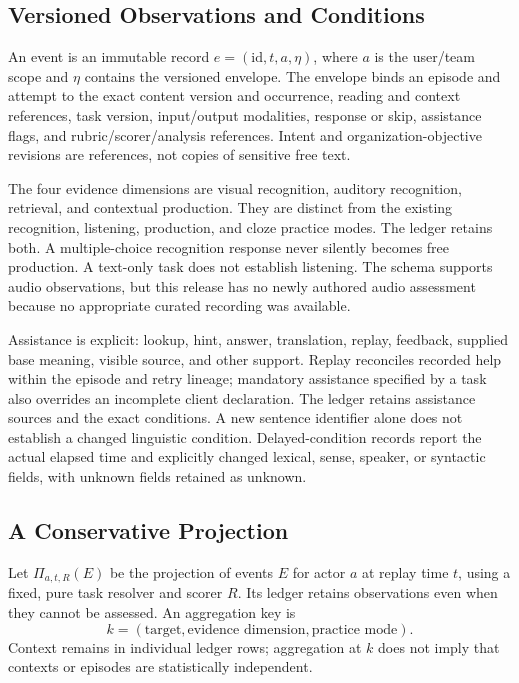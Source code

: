 \documentclass{article}
\begin{document}
\subsection{Versioned Observations and Conditions}

An event is an immutable record $e=(\mathrm{id},t,a,\eta)$, where $a$ is the user/team scope and $\eta$ contains the versioned envelope. The envelope binds an episode and attempt to the exact content version and occurrence, reading and context references, task version, input/output modalities, response or skip, assistance flags, and rubric/scorer/analysis references. Intent and organization-objective revisions are references, not copies of sensitive free text.

The four evidence dimensions are visual recognition, auditory recognition, retrieval, and contextual production. They are distinct from the existing recognition, listening, production, and cloze practice modes. The ledger retains both. A multiple-choice recognition response never silently becomes free production. A text-only task does not establish listening. The schema supports audio observations, but this release has no newly authored audio assessment because no appropriate curated recording was available.

Assistance is explicit: lookup, hint, answer, translation, replay, feedback, supplied base meaning, visible source, and other support. Replay reconciles recorded help within the episode and retry lineage; mandatory assistance specified by a task also overrides an incomplete client declaration. The ledger retains assistance sources and the exact conditions. A new sentence identifier alone does not establish a changed linguistic condition. Delayed-condition records report the actual elapsed time and explicitly changed lexical, sense, speaker, or syntactic fields, with unknown fields retained as unknown.

\subsection{A Conservative Projection}

Let $\Pi_{a,t,R}(E)$ be the projection of events $E$ for actor $a$ at replay time $t$, using a fixed, pure task resolver and scorer $R$. Its ledger retains observations even when they cannot be assessed. An aggregation key is
\begin{equation}
 k=(\text{target},\text{evidence dimension},\text{practice mode}).
\end{equation}
Context remains in individual ledger rows; aggregation at $k$ does not imply that contexts or episodes are statistically independent.
\end{document}
